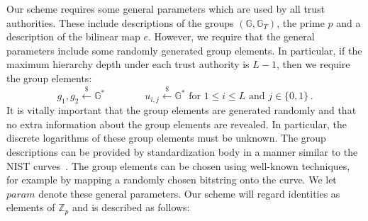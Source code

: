 \documentclass[10pt]{llncs}
\newcommand{\Gbb}{\mathbb{G}}
\newcommand{\Zbb}{\mathbb{Z}}
\newcommand{\param}{\mathit{param}}
\newcommand{\getsr}{\stackrel{{\scriptscriptstyle\$}}{\gets}}
\begin{document}
Our scheme requires some general parameters which are used by all
trust authorities. These include descriptions of the groups
$(\Gbb,\Gbb_{T})$, the prime $p$ and a description of the bilinear
map $e$. However, we require that the general parameters include
some randomly generated group elements. In particular, if the
maximum hierarchy depth under each trust authority is $L-1$, then we
require the group elements:
\begin{displaymath}
g_{1}, g_{2} \getsr \Gbb^{*} \qquad \qquad u_{i,j} \getsr \Gbb^{*}
\mbox{ for } 1\leq i\leq L \mbox{ and } j\in \{0,1\} \, .
\end{displaymath}
It is vitally important that the group elements are generated
randomly and that no extra information about the group elements are
revealed. In particular, the discrete logarithms of these group
elements must be unknown. The group descriptions can be provided by
standardization body in a manner similar to the NIST
curves~\cite{NISTcurves}. The group elements can be chosen using
well-known techniques, for example by mapping a randomly chosen
bitstring onto the curve. We let $\param$ denote these general
parameters. Our scheme will regard identities as elements of
$\Zbb_{p}$ and is described as follows:
\end{document}
